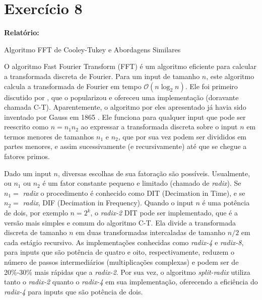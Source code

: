 
\section*{\large Exercício 8}
%

\textbf{Relatório:} 

\begin{center}
\large{Algoritmo FFT de Cooley-Tukey e Abordagens Similares}
\end{center}

O algoritmo Fast Fourier Transform (FFT) é um algoritmo eficiente para calcular a transformada discreta de Fourier. Para um input de tamanho $n$, este algoritmo calcula a transformada de Fourier em tempo $\mathcal{O}(n\log_{2}n)$. Ele foi primeiro discutido por , que o popularizou e ofereceu uma implementação (doravante chamada C-T). Aparentemente, o algoritmo por eles apresentado já havia sido inventado por Gauss em 1865 \cite{strang1993wavelet}. Ele funciona para qualquer input que pode ser reescrito como $n=n_1 n_2$ ao expressar a transformada discreta sobre o input $n$ em termos menores de tamanhos $n_1$ e $n_2$, que por sua vez podem ser divididos em partes menores, e assim sucessivamente (e recursivamente) até que se chegue a fatores primos. 

Dado um input $n$, diversas escolhas de sua fatoração são possíveis. Usualmente, ou  $n_1$ ou $n_2$ é um fator constante pequeno e limitado (chamado de \textit{radix}). Se $n_1 = $ \textit{radix} o procedimento é conhecido como DIT (Decimation in Time), e se $n_2 = $ \textit{radix}, DIF (Decimation in Frequency). Quando o input $n$ é uma potência de dois, por exemplo $n=2^{k}$, o \textit{radix-2} DIT pode ser implementado, que é a versão mais simples e comum do algoritmo C-T. Ela divide a transformada discreta de tamanho $n$ em duas transformadas intercaladas de tamanho $n/2$ em cada estágio recursivo. As implementações conhecidas como \textit{radix-4} e \textit{radix-8}, para inputs que são potência de quatro e oito, respectivamente, reduzem o número de passos intermediários (multiplicações complexas) e podem ser de 20\%-30\% mais rápidas que a \textit{radix-2}. Por sua vez, o algoritmo \textit{split-radix} utiliza tanto o \textit{radix-2} quanto o \textit{radix-4} em sua implementação, oferecendo a eficiência do \textit{radix-4} para inputs que são potência de dois.

